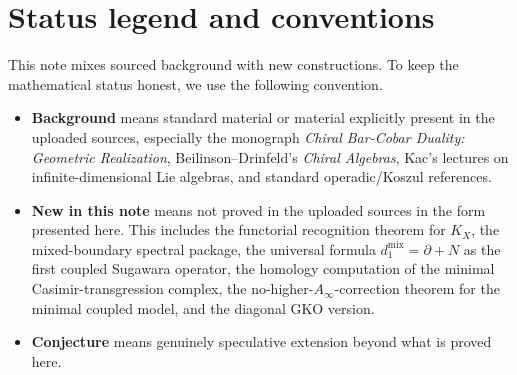 \begin{abstract}
\begin{enumerate}[label=\textup{(\Roman*)},leftmargin=2.2em]
\item We prove a rigidity theorem: the minimal coupled Casimir-transgression complex is formal. Hence the transferred minimal \(A_\infty\)-structure on its homology is strict:
\[
m_n=0 \qquad (n\ge 3).
\]
Thus, for the minimal coupled model, there are \emph{no} higher \(A_\infty\)-corrections beyond the quadratic Casimir equation.

\item We derive an analogous diagonal theorem for the GKO coupling. The minimal coupled homology is again a strict quadric quotient, now cut out by the diagonal Casimir.
\end{enumerate}

The conceptual upshot is simple: \emph{reconstruction} is \(\Cob_X\Bbar_X\), \emph{duality} is \(\Cob_X\D_{\Ran}\Bbar_X\), the first mixed Sugawara obstruction is universal and harmless (\(\partial+N\)), and the first genuine coupled obstruction is the Casimir relation. In the minimal coupled sector, the answer is a derived quadric---but because the Casimir equation is regular, that derived quadric is in fact classical.
\end{abstract}

\tableofcontents

\section{Status legend and conventions}

This note mixes sourced background with new constructions. To keep the mathematical status honest, we use the following convention.

\begin{itemize}[leftmargin=2.3em]
\item \textbf{Background} means standard material or material explicitly present in the uploaded sources, especially the monograph \emph{Chiral Bar-Cobar Duality: Geometric Realization}, Beilinson--Drinfeld's \emph{Chiral Algebras}, Kac's lectures on infinite-dimensional Lie algebras, and standard operadic/Koszul references.
\item \textbf{New in this note} means not proved in the uploaded sources in the form presented here. This includes the functorial recognition theorem for \(K_X\), the mixed-boundary spectral package, the universal formula \(d_1^{\mathrm{mix}}=\partial+N\) as the first coupled Sugawara operator, the homology computation of the minimal Casimir-transgression complex, the no-higher-\(A_\infty\)-correction theorem for the minimal coupled model, and the diagonal GKO version.
\item \textbf{Conjecture} means genuinely speculative extension beyond what is proved here.
\end{itemize}

